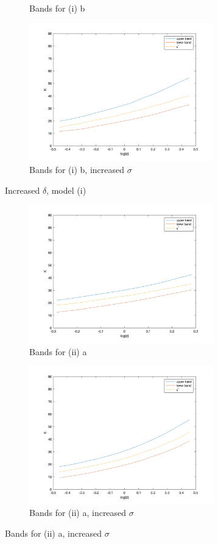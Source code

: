 \documentclass[10pt,letter]{article}
\begin{document}
\begin{center}
\begin{figure}
\begin{subfigure}{.5\textwidth}
\caption{Bands for (i) b}
\end{subfigure}
\begin{subfigure}{.5\textwidth}
\includegraphics[width=8cm]{ps3q2_fig20}
\caption{Bands for (i) b, increased $\sigma$}
\end{subfigure}
\caption{Increased $\delta$, model (i)}
\end{figure}
\begin{figure}
\begin{subfigure}{.5\textwidth}
\includegraphics[width=8cm]{ps3q2_fig21}
\caption{Bands for (ii) a}
\end{subfigure}
\begin{subfigure}{.5\textwidth}
\includegraphics[width=8cm]{ps3q2_fig22}
\caption{Bands for (ii) a, increased $\sigma$}
\end{subfigure}

\end{figure}
\end{center}
\end{document}
